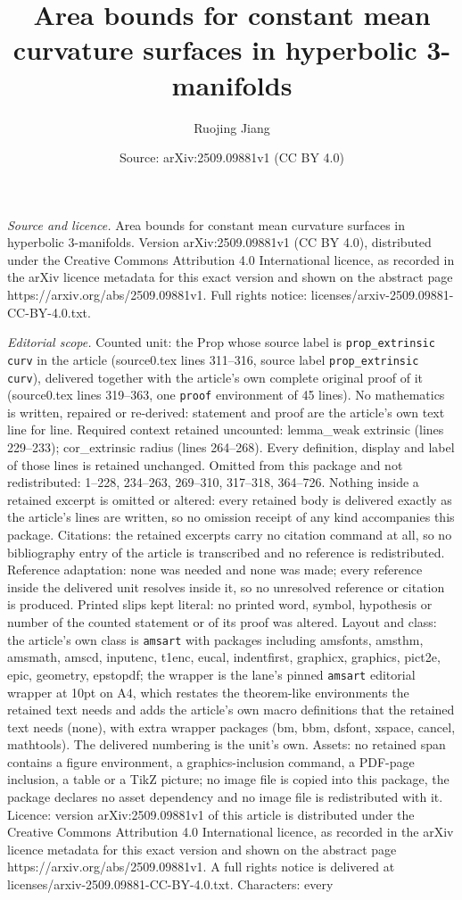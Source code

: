 \documentclass[10pt,a4paper]{amsart}
\title[Area bounds for constant mean curvature surfaces in hyperbol]{Area bounds for constant mean curvature surfaces in hyperbolic 3-manifolds}
\author{Ruojing Jiang}
\date{Source: arXiv:2509.09881v1 (CC BY 4.0)}
\begin{document}
\maketitle

\noindent\emph{Source and licence.} Area bounds for constant mean curvature surfaces in hyperbolic 3-manifolds. Version arXiv:2509.09881v1 (CC BY 4.0), distributed under the Creative Commons Attribution 4.0 International licence, as recorded in the arXiv licence metadata for this exact version and shown on the abstract page https://arxiv.org/abs/2509.09881v1. Full rights notice: licenses/arxiv-2509.09881-CC-BY-4.0.txt.\par\smallskip

\noindent\textit{Editorial scope.} Counted unit: the Prop whose source label is \texttt{prop\_extrinsic curv} in the article (source0.tex lines 311--316, source label \texttt{prop\_extrinsic curv}), delivered together with the article's own complete original proof of it (source0.tex lines 319--363, one \texttt{proof} environment of 45 lines). No mathematics is written, repaired or re-derived: statement and proof are the article's own text line for line. Required context retained uncounted: lemma\_weak extrinsic (lines 229--233); cor\_extrinsic radius (lines 264--268). Every definition, display and label of those lines is retained unchanged. Omitted from this package and not redistributed: 1--228, 234--263, 269--310, 317--318, 364--726. Nothing inside a retained excerpt is omitted or altered: every retained body is delivered exactly as the article's lines are written, so no omission receipt of any kind accompanies this package. Citations: the retained excerpts carry no citation command at all, so no bibliography entry of the article is transcribed and no reference is redistributed. Reference adaptation: none was needed and none was made; every reference inside the delivered unit resolves inside it, so no unresolved reference or citation is produced. Printed slips kept literal: no printed word, symbol, hypothesis or number of the counted statement or of its proof was altered. Layout and class: the article's own class is \texttt{amsart} with packages including amsfonts, amsthm, amsmath, amscd, inputenc, t1enc, eucal, indentfirst, graphicx, graphics, pict2e, epic, geometry, epstopdf; the wrapper is the lane's pinned \texttt{amsart} editorial wrapper at 10pt on A4, which restates the theorem-like environments the retained text needs and adds the article's own macro definitions that the retained text needs (none), with extra wrapper packages (bm, bbm, dsfont, xspace, cancel, mathtools). The delivered numbering is the unit's own. Assets: no retained span contains a figure environment, a graphics-inclusion command, a PDF-page inclusion, a table or a TikZ picture; no image file is copied into this package, the package declares no asset dependency and no image file is redistributed with it. Licence: version arXiv:2509.09881v1 of this article is distributed under the Creative Commons Attribution 4.0 International licence, as recorded in the arXiv licence metadata for this exact version and shown on the abstract page https://arxiv.org/abs/2509.09881v1. A full rights notice is delivered at licenses/arxiv-2509.09881-CC-BY-4.0.txt. Characters: every 
\end{document}

